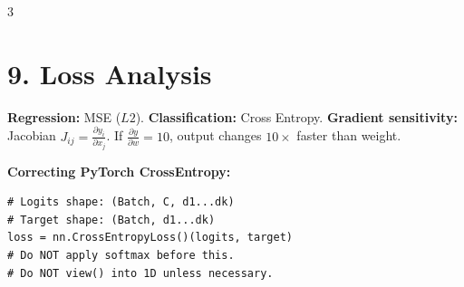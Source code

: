 \documentclass[10pt]{article}
\begin{document}
\begin{multicols*}{3}
\section*{9. Loss Analysis}
\textbf{Regression:} MSE ($L2$).
\textbf{Classification:} Cross Entropy.
\textbf{Gradient sensitivity:} Jacobian $J_{ij} = \frac{\partial y_i}{\partial x_j}$. If $\frac{\partial y}{\partial w} = 10$, output changes $10\times$ faster than weight.

\textbf{Correcting PyTorch CrossEntropy:}
\begin{lstlisting}
# Logits shape: (Batch, C, d1...dk)
# Target shape: (Batch, d1...dk)
loss = nn.CrossEntropyLoss()(logits, target)
# Do NOT apply softmax before this.
# Do NOT view() into 1D unless necessary.
\end{lstlisting}

\end{multicols*}
\end{document}
